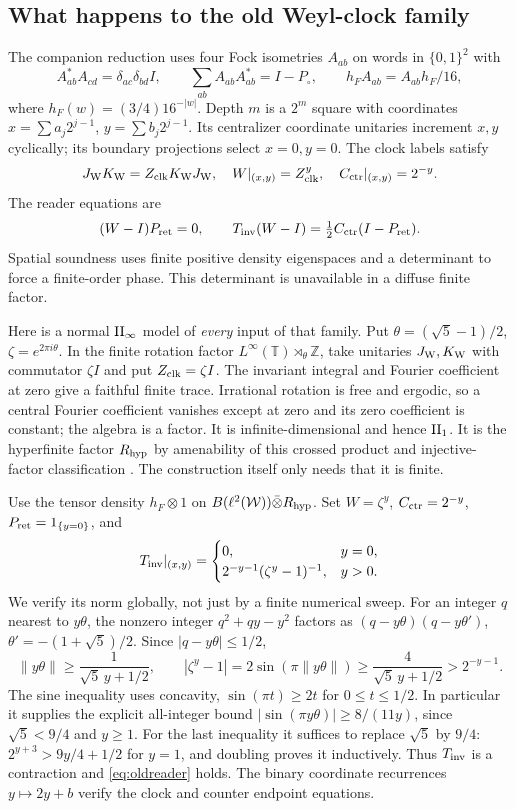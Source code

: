 \subsection{What happens to the old Weyl-clock family}
The companion reduction \cite[Sections 4--7]{Spatial} uses four Fock
isometries $A_{ab}$ on words in $\{0,1\}^2$ with
\[
 A_{ab}^*A_{cd}=\delta_{ac}\delta_{bd}I,\qquad
 \sum_{ab}A_{ab}A_{ab}^*=I-P_\circ,\qquad
 h_FA_{ab}=A_{ab}h_F/16,
\]
where $h_F(w)=(3/4)16^{-|w|}$.
Depth $m$ is a $2^m$ square with coordinates
$x=\sum a_j2^{j-1}$, $y=\sum b_j2^{j-1}$.
Its centralizer coordinate unitaries increment $x,y$ cyclically;
its boundary projections select $x=0,y=0$.
The clock labels satisfy
\[
 J_{\rm W}K_{\rm W}=Z_{\rm clk}K_{\rm W}J_{\rm W},\quad
 W|_{(x,y)}=Z_{\rm clk}^y,\quad C_{\rm ctr}|_{(x,y)}=2^{-y}.
\]
The reader equations are
\begin{equation}\label{eq:oldreader}
 (W-I)P_{\rm ret}=0,\qquad
 T_{\rm inv}(W-I)=\tfrac12C_{\rm ctr}(I-P_{\rm ret}).
\end{equation}
Spatial soundness uses finite positive density eigenspaces and a
determinant to force a finite-order phase. This determinant is unavailable
in a diffuse finite factor.

Here is a normal $\mathrm{II}_\infty$ model of \emph{every} input of that family.
Put $\theta=(\sqrt5-1)/2$, $\zeta=e^{2\pi i\theta}$.
In the finite rotation factor
$L^\infty(\mathbb T)\rtimes_\theta\mathbb Z$, take unitaries
$J_{\rm W},K_{\rm W}$ with commutator $\zeta I$ and put
$Z_{\rm clk}=\zeta I$.
The invariant integral and Fourier coefficient at zero give a faithful
finite trace. Irrational rotation is free and ergodic, so a central
Fourier coefficient vanishes except at zero and its zero coefficient
is constant; the algebra is a factor. It is infinite-dimensional and
hence $\mathrm{II}_1$. It is the hyperfinite factor $R_{\rm hyp}$ by amenability of this
crossed product and injective-factor classification \cite{Connes76}.
The construction itself only needs that it is finite.

Use the tensor density $h_F\otimes1$ on
$B(\ell^2(\mathcal W))\bar\otimes R_{\rm hyp}$.
Set $W=\zeta^y$, $C_{\rm ctr}=2^{-y}$,
$P_{\rm ret}=1_{\{y=0\}}$, and
\[
 T_{\rm inv}|_{(x,y)}=
 \begin{cases}0,&y=0,\\
 2^{-y-1}(\zeta^y-1)^{-1},&y>0.
 \end{cases}
\]
We verify its norm globally, not just by a finite numerical sweep.
For an integer $q$ nearest to $y\theta$, the nonzero integer
$q^2+qy-y^2$ factors as
$(q-y\theta)(q-y\theta')$, $\theta'=-(1+\sqrt5)/2$.
Since $|q-y\theta|\leq1/2$,
\[
 \|y\theta\|\geq\frac1{\sqrt5\,y+1/2},\qquad
 |\zeta^y-1|=2\sin(\pi\|y\theta\|)
 \geq\frac4{\sqrt5\,y+1/2}>2^{-y-1}.
\]
The sine inequality uses concavity, $\sin(\pi t)\geq2t$
for $0\leq t\leq1/2$. In particular it supplies the explicit
all-integer bound $|\sin(\pi y\theta)|\geq8/(11y)$, since
$\sqrt5<9/4$ and $y\geq1$.
For the last inequality it suffices to replace $\sqrt5$ by $9/4$:
$2^{y+3}>9y/4+1/2$ for $y=1$, and doubling proves it inductively.
Thus $T_{\rm inv}$ is a contraction and
\eqref{eq:oldreader} holds. The binary coordinate recurrences
$y\mapsto2y+b$ verify the clock and counter endpoint equations.

